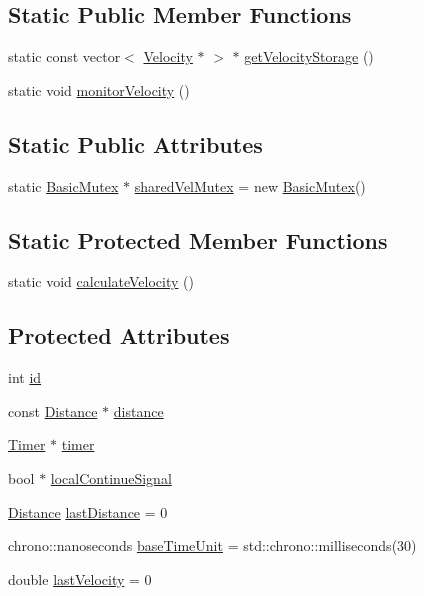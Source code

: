 \subsection*{Static Public Member Functions}
\begin{DoxyCompactItemize}
\item 
static const vector$<$ \hyperlink{struct_velocity}{Velocity} $\ast$ $>$ $\ast$ \hyperlink{struct_velocity_af8c34fb6b57a667c06e7baa1801f5df9}{get\-Velocity\-Storage} ()
\item 
static void \hyperlink{struct_velocity_ab96b02fb83753526f730e2c5b0337a62}{monitor\-Velocity} ()
\end{DoxyCompactItemize}
\subsection*{Static Public Attributes}
\begin{DoxyCompactItemize}
\item 
static \hyperlink{class_basic_mutex}{Basic\-Mutex} $\ast$ \hyperlink{struct_velocity_a68112c2f090288d4921a53a21390eac8}{shared\-Vel\-Mutex} = new \hyperlink{class_basic_mutex}{Basic\-Mutex}()
\end{DoxyCompactItemize}
\subsection*{Static Protected Member Functions}
\begin{DoxyCompactItemize}
\item 
static void \hyperlink{struct_velocity_a7676bfee3f05da2e4ced84c838f0c1c6}{calculate\-Velocity} ()
\end{DoxyCompactItemize}
\subsection*{Protected Attributes}
\begin{DoxyCompactItemize}
\item 
int \hyperlink{struct_velocity_a3f33b62ecfeeeb79c13cd732fbb3a05c}{id}
\item 
const \hyperlink{_velocity_8hpp_a29fbe3dd3ce308a36d5b29488daddcaa}{Distance} $\ast$ \hyperlink{struct_velocity_a3f3d268a5d9452ad912c19cfcc7c0394}{distance}
\item 
\hyperlink{class_timer}{Timer} $\ast$ \hyperlink{struct_velocity_a99f61fd4486ecad5fdbf0c8d3da8c4a0}{timer}
\item 
bool $\ast$ \hyperlink{struct_velocity_a099e0c3e044ce52e11b1e7ab225f896c}{local\-Continue\-Signal}
\item 
\hyperlink{_velocity_8hpp_a29fbe3dd3ce308a36d5b29488daddcaa}{Distance} \hyperlink{struct_velocity_a4a65b272ce588eab6a9a9fa1fdb94a01}{last\-Distance} = 0
\item 
chrono\-::nanoseconds \hyperlink{struct_velocity_a70e2af5664f11aeb266920916c271712}{base\-Time\-Unit} = std\-::chrono\-::milliseconds(30)
\item 
double \hyperlink{struct_velocity_acb312e3b7523314efd771a52fe8f2982}{last\-Velocity} = 0
\end{DoxyCompactItemize}
